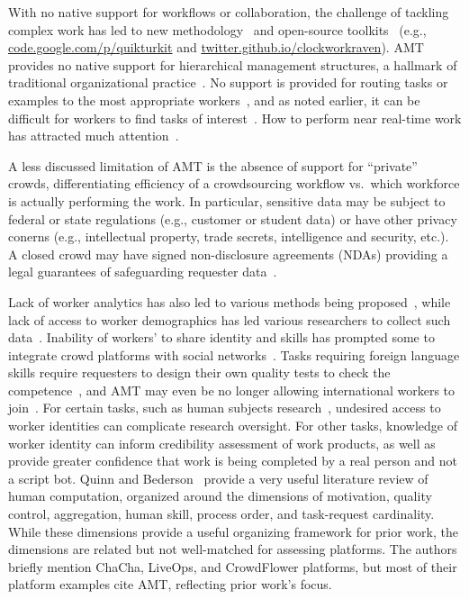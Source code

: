 \documentclass{sigchi}
\begin{document}
With no native support for workflows or collaboration, the challenge of tackling complex work has led to new methodology~\cite{kittur2012crowdweaver,kulkarni2012collaboratively,ahmad2011jabberwocky,noronha2011platemate} and open-source toolkits~\cite{little2009turkit,kittur2011crowdforge} (e.g., \url{code.google.com/p/quikturkit} and \url{twitter.github.io/clockworkraven}). 
AMT provides no native support for hierarchical management structures, a hallmark of traditional organizational practice~\cite{kochhar2010anatomy}. No support is provided for routing tasks or examples to the most appropriate workers~\cite{Ho2012}, and as noted earlier, it can be difficult for workers to find tasks of interest~\cite{chilton2010task,law2011effects}. How to perform near real-time work has attracted much attention~\cite{bigham2010vizwiz,bernstein2010soylent,bernstein2011crowds,lasecki2012real}. 

A less discussed limitation of AMT is the absence of support for ``private'' crowds, differentiating efficiency of a crowdsourcing workflow vs.\ which workforce is actually performing the work.  In particular, sensitive data may be subject to federal or state regulations (e.g., customer or student data) or have other privacy conerns (e.g., intellectual property, trade secrets, intelligence and security, etc.). A closed crowd may have signed non-disclosure agreements (NDAs) providing a legal guarantees of safeguarding requester data~\cite{Nallapati13}. 

Lack of worker analytics has also led to various methods being proposed~\cite{heymann2011turkalytics,Rzeszotarski11}, while lack of access to worker demographics has led various researchers to collect such data~\cite{Ross10,ipeirotis2010demographics}. Inability of workers' to share identity and skills has prompted some to integrate crowd platforms with social networks~\cite{difallah13}. Tasks requiring foreign language skills require requesters to design their own quality tests to check the competence~\cite{mellebeek2010opinion}, and AMT may even be no longer allowing international workers to join~\cite{no-intl}. For certain tasks, such as human subjects research~\cite{mason2012conducting}, undesired access to worker identities can complicate research oversight. For other tasks, knowledge of worker identity can inform credibility assessment of work products, as well as provide greater confidence that work is being completed by a real person and not a script bot. 
Quinn and Bederson~\cite{Quinn11} provide a very useful literature review of human computation, organized around the dimensions of motivation, quality control, aggregation, human skill, process order, and task-request cardinality. While these dimensions provide a useful organizing framework for prior work, the dimensions are related but not well-matched for assessing platforms. The authors briefly mention ChaCha, LiveOps, and CrowdFlower platforms, but most of their platform examples cite AMT, reflecting prior work's focus.
\end{document}
